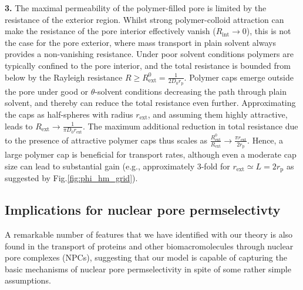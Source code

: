 \documentclass[12pt, a4paper]{article}
\begin{document}
\textbf{3.}
The maximal permeability of the polymer-filled pore is limited by the resistance of the exterior region.
Whilst strong  polymer-colloid attraction can make the resistance of the pore interior effectively vanish ($R_{\text{int}} \to 0$), this is not the case for the pore exterior, where mass transport in plain solvent always provides a non-vanishing resistance.
Under poor solvent conditions  polymers are typically confined to the pore interior, and the total resistance is bounded from below by the Rayleigh resistance  $R \geq R_{\text{ext}}^{0} = \frac{1}{2 D_0 r_{\text{p}}}$.
Polymer caps emerge outside the pore under good or $\theta$-solvent conditions decreasing the path through plain solvent, and thereby can reduce the total resistance even further. Approximating the caps as half-spheres with radius $r_{\text{ext}}$, and assuming them highly attractive, leads to $R_{\text{ext}} \to \frac{1}{ \pi D_0 r_{\text{ext}}}$.
The maximum additional reduction in total resistance due to the presence of attractive polymer caps thus scales as $\frac{R_{\text{ext}}^{0}}{R_{\text{ext}}} \to \frac{\pi r_{\text{ext}}}{2 r_{\text{p}}}$.
Hence, a large polymer cap is beneficial for transport rates, although even a moderate cap size can lead to substantial gain (e.g., approximately 3-fold for $r_{\text{ext}}\simeq L = 2r_{\text{p}}$ as suggested by Fig.\ref{fig:phi_hm_grid}).

\bigskip



\subsection{Implications for nuclear pore permselectivty}

A remarkable number of features that we have identified with our theory is also found in the transport of proteins and other biomacromolecules through nuclear pore complexes (NPCs), suggesting that our model is capable of capturing the basic mechanisms of nuclear pore permselectivity in spite of some rather simple assumptions.
\end{document}
